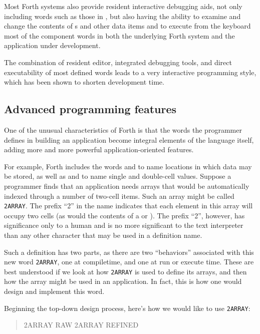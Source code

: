 Most Forth systems also provide resident interactive debugging aids,
not only including words such as those in , but also having the ability
to examine and change the contents of s and other
data items and to execute from the keyboard most of the component
words in both the underlying Forth system and the application under
development.

The combination of resident editor, integrated debugging tools, and
direct executability of most defined words leads to a very interactive
programming style, which has been shown to shorten development time.

\subsection{Advanced programming features} %

One of the unusual characteristics of Forth is that the words the
programmer defines in building an application become integral elements
of the language itself, adding more and more powerful
application-oriented features.

For example, Forth includes the words  and
 to name locations in which data may be
stored, as well as  and 
to name single and double-cell values. Suppose a programmer finds that
an application needs arrays that would be automatically indexed
through a number of two-cell items. Such an array might be called
\texttt{2ARRAY}. The prefix ``2'' in the name indicates that each
element in this array will occupy two cells (as would the contents
of a  or ). The prefix
``2'', however, has significance only to a human and is no more
significant to the text interpreter than any other character that
may be used in a definition name.

Such a definition has two parts, as there are two ``behaviors''
associated with this new word \texttt{2ARRAY}, one at compiletime,
and one at run or execute time. These are best understood if we look
at how \texttt{2ARRAY} is used to define its arrays, and then how the
array might be used in an application. In fact, this is how one would
design and implement this word.

Beginning the top-down design process, here's how we would like to
use \texttt{2ARRAY}:

\begin{quote} 2ARRAY RAW  2ARRAY REFINED
\end{quote}

